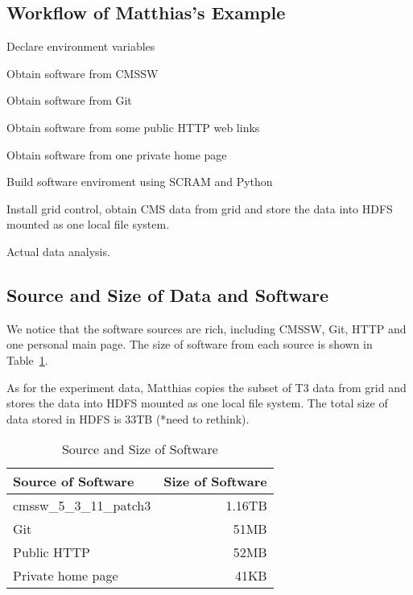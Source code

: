 \documentclass{acm_proc_article-sp}
\begin{document}

\subsection{Workflow of Matthias's Example}
Declare environment variables

Obtain software from CMSSW

Obtain software from Git

Obtain software from some public HTTP web links

Obtain software from one private home page

Build software enviroment using SCRAM and Python

Install grid control, obtain CMS data from grid and store the data into HDFS mounted as one local file system.

Actual data analysis.

\subsection{Source and Size of Data and Software}
We notice that the software sources are rich, including CMSSW, Git, HTTP and one personal main page. The size of software from each source is shown in Table~\ref{table:software-source-size}.

As for the experiment data, Matthias copies the subset of T3 data from grid and stores the data into HDFS mounted as one local file system. The total size of data stored in HDFS is 33TB (*need to rethink).

\begin{table}
    \centering
    \begin{tabular}{|l|r|}
        \hline
        Source of Software & Size of Software \\ \hline
        cmssw\_5\_3\_11\_patch3 & 1.16TB \\ \hline
        Git & 51MB \\ \hline
        Public HTTP & 52MB \\ \hline
        Private home page & 41KB \\ \hline
    \end{tabular}
    \caption{Source and Size of Software}
    \label{table:software-source-size}
\end{table}
\end{document}
